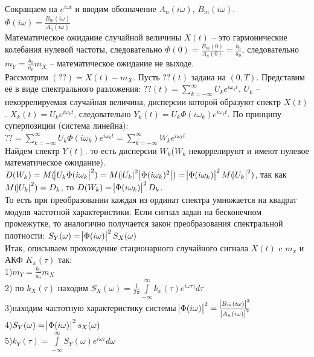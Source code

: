 \documentclass[russian, 12pt, fleqn]{article}
\begin{document}
Сокращаем на $e^{i\omega t}$ и вводим обозначение $A_n(i\omega)$, $B_m(i\omega)$.\\
$\Phi(i\omega)= \frac{B_m(i\omega)}{A_n(i\omega)}$\\
Математическое ожидание случайной величины $X(t)$ -- это гармонические колебания нулевой частоты, следовательно $\Phi(0) = \frac{B_m(0)}{A_n(0)} = \frac{b_0}{a_0}$, следовательно $m_Y = \frac{b_0}{a_0}m_X$ -- математическое ожидание не выходе.\\
Рассмотрим $(??) =  X(t) - m_X$. Пусть $??(t)$ задана на $(0, T)$. Представим её в виде спектрального разложения: $??(t) = \displaystyle{\sum \limits _{k  = - \infty} ^ {\infty}} U_k e^{i \omega_k t}$. $U_k$ -- некоррелируемая случайная величина, дисперсии которой образуют спектр $X(t)$. $X_k(t) = U_k e^{i\omega_k t}$, следовательно $Y_k(t) = U_k \Phi(i\omega_k) e^{i \omega_k t}$. По принципу суперпозиции (система линейна): $?? =   \displaystyle{\sum \limits_{k = -\infty}^{\infty}} U_k \Phi(i\omega_k) e^{i\omega_k t} = \displaystyle{\sum \limits _{k  = - \infty} ^ {\infty}} W_k e^{i \omega_k t}$\\
Найдем спектр $Y(t)$. то есть дисперсии $W_k$($W_k$ некоррелируют и имеют нулевое математическое ожидание).\\
$D(W_k) = M(\abs{U_k \Phi(i\omega_k }^2 ) =  M(\abs{U_k}^2 \abs{\Phi(i\omega_k )^2 } ) = \abs{\Phi(i \omega_k)}^2 M(\abs{U_k}^2)$, так как $M(\abs{U_k}^2) = D_k$, то $D(W_k) = \abs{\Phi(i\omega_k)}^2 D_k$.\\
То есть при преобразовании каждая из ординат спектра умножается на квадрат модуля частотной характеристики. Если сигнал задан на бесконечном промежутке, то аналогично получается закон преобразования спектральной плотности: $S_Y(\omega) = \abs{\Phi(i\omega)}^2 S_X(\omega)$\\
Итак, описываем прохождение стационарного случайного сигнала $X(t)$ c $m_x$ и АКФ $K_x(\tau)$ так:\\
1)$m_Y = \frac{b_0}{a_0}m_X$\\
2) по $k_X(\tau)$ находим $S_X(\omega) = \frac{1}{2\pi}  \displaystyle{\int \limits _ { - \infty} ^ {\infty}} k_x(\tau) e ^{i \omega \tau)} d \tau$ \\
3)находим частотную характеристику системы $\abs{\Phi(i\omega)}^2 = \frac{\abs{B_m(i\omega)}^2}{\abs{A_n(i\omega)}^2}$\\
4)$S_Y(\omega) = \abs{\Phi(i\omega)}^2 s_X (\omega)$\\
5)$k_Y(\tau) =  \displaystyle{\int \limits_{-\infty}^{\infty}} S_Y (\omega) e^{i \omega \tau} d\omega$\\
\end{document}
